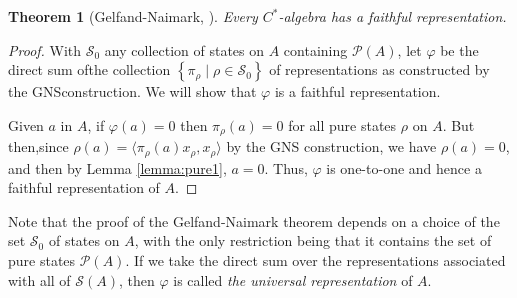 \documentclass[11pt,a4paper]{report}
\theoremstyle{plain}
\newtheorem{thm}{Theorem}
\theoremstyle{definition}
\newcommand{\1}{\mathbbm{1}}
\renewcommand{\phi}{\varphi}
\renewcommand{\S}{\mathscr{S}}
\renewcommand{\P}[1]{\mathscr{P}(#1)}
\begin{document}
\begin{thm}[Gelfand-Naimark, {\cite[4.5.6]{kadison83}}] \label{thm:gn}
	Every $C^\ast$-algebra has a faithful representation.
\end{thm}
\begin{proof}
	With $\S_0$ any collection of states on $A$ containing $\P{A}$, let $\phi$ be 
	the direct sum ofthe collection $\left\{\pi_\rho \mid \rho\in\S_0\right\}$ of 
	representations as constructed by the GNSconstruction. We will show that $\phi$ 
	is a faithful representation.

	
	Given $a$ in $A$, if $\phi(a)=0$ then $\pi_\rho(a)=0$ for all pure states $\rho$ 
	on $A$. But then,since $\rho(a)=\langle \pi_\rho (a) x_\rho, x_\rho \rangle$ by 
	the GNS construction, we have $\rho(a)=0$, and then by Lemma \ref{lemma:pure1}, 
	$a=0$. Thus, $\phi$ is one-to-one and hence a faithful representation of $A$.

\end{proof}

Note that the proof of the Gelfand-Naimark theorem depends on a choice of the 
set $\S_0$ of states on $A$, with the only restriction being that it contains 
the set of pure states $\P A$. If we take the direct sum over the 
representations associated with all of $\S (A)$, then $\phi$ is called \emph{the 
universal representation} of $A$.
\end{document}

